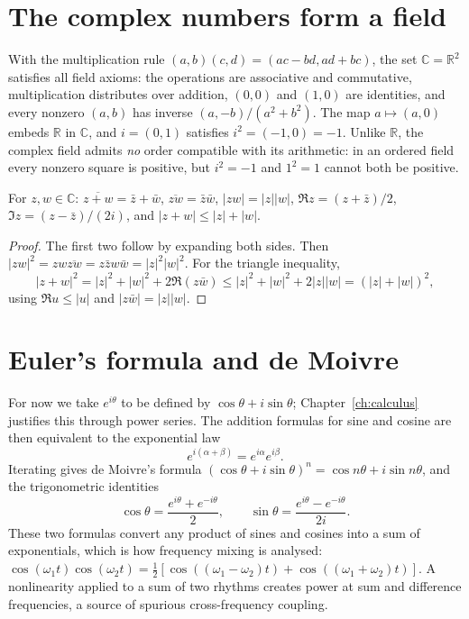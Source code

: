 \section{The complex numbers form a field}
With the multiplication rule $(a,b)(c,d)=(ac-bd,ad+bc)$, the set $\mathbb C=\mathbb R^2$ satisfies all field axioms: the operations are associative and commutative, multiplication distributes over addition, $(0,0)$ and $(1,0)$ are identities, and every nonzero $(a,b)$ has inverse $(a,-b)/(a^2+b^2)$. The map $a\mapsto(a,0)$ embeds $\mathbb R$ in $\mathbb C$, and $i=(0,1)$ satisfies $i^2=(-1,0)=-1$. Unlike $\mathbb R$, the complex field admits \emph{no} order compatible with its arithmetic: in an ordered field every nonzero square is positive, but $i^2=-1$ and $1^2=1$ cannot both be positive.

\begin{proposition}
For $z,w\in\mathbb C$: $\overline{z+w}=\bar z+\bar w$, $\overline{zw}=\bar z\bar w$, $|zw|=|z||w|$, $\Re z=(z+\bar z)/2$, $\Im z=(z-\bar z)/(2i)$, and $|z+w|\le|z|+|w|$.
\end{proposition}
\begin{proof}
The first two follow by expanding both sides. Then $|zw|^2=zw\overline{zw}=z\bar zw\bar w=|z|^2|w|^2$. For the triangle inequality,
\[
|z+w|^2=|z|^2+|w|^2+2\Re(z\bar w)\le|z|^2+|w|^2+2|z||w|=(|z|+|w|)^2,
\]
using $\Re u\le|u|$ and $|z\bar w|=|z||w|$.
\end{proof}

\section{Euler's formula and de Moivre}
For now we take $e^{i\theta}$ to be defined by $\cos\theta+i\sin\theta$; Chapter~\ref{ch:calculus} justifies this through power series. The addition formulas for sine and cosine are then equivalent to the exponential law
\[
e^{i(\alpha+\beta)}=e^{i\alpha}e^{i\beta}.
\]
Iterating gives de Moivre's formula $(\cos\theta+i\sin\theta)^n=\cos n\theta+i\sin n\theta$, and the trigonometric identities
\[
\cos\theta=\frac{e^{i\theta}+e^{-i\theta}}2,\qquad\sin\theta=\frac{e^{i\theta}-e^{-i\theta}}{2i}.
\]
These two formulas convert any product of sines and cosines into a sum of exponentials, which is how frequency mixing is analysed: $\cos(\omega_1t)\cos(\omega_2t)=\tfrac12[\cos((\omega_1-\omega_2)t)+\cos((\omega_1+\omega_2)t)]$. A nonlinearity applied to a sum of two rhythms creates power at sum and difference frequencies, a source of spurious cross-frequency coupling.

